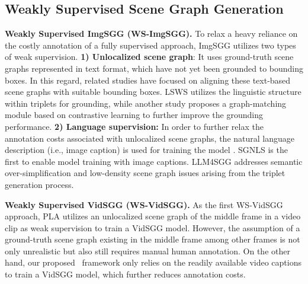 \vspace{-1.5ex}
\subsection{Weakly Supervised Scene Graph Generation}
\vspace{-0.5ex}
\noindent\textbf{Weakly Supervised ImgSGG (WS-ImgSGG). }
To relax a heavy reliance on the costly annotation of a fully supervised approach, ImgSGG utilizes two types of weak supervision. \textbf{1) Unlocalized scene graph}: It uses ground-truth scene graphs represented in text format, which have not yet been grounded to bounding boxes. In this regard, related studies \citep{ye2021linguistic,shi2021simple,zareian2020weakly,li2022integrating} have focused on aligning these text-based scene graphs with suitable bounding boxes. LSWS \citep{ye2021linguistic} utilizes the linguistic structure within triplets for grounding, while another study \citep{shi2021simple} proposes a graph-matching module based on contrastive learning to further improve the grounding performance. \textbf{2) Language supervision:} In order to further relax the annotation costs associated with unlocalized scene graphs, the natural language description (i.e., image caption) is used for training the model \citep{zhong2021learning,kim2024llm4sgg,zhang2023learning}. SGNLS \citep{zhong2021learning} is the first to enable model training with image captions. LLM4SGG \citep{kim2024llm4sgg} addresses semantic over-simplification and low-density scene graph issues arising from the triplet generation process. 

\smallskip
\noindent\textbf{Weakly Supervised VidSGG (WS-VidSGG). }
As the first WS-VidSGG approach, PLA \citep{chen2023video} utilizes an unlocalized scene graph of the middle frame in a video clip as weak supervision to train a VidSGG model. 
However, the assumption of a ground-truth scene graph existing in the middle frame among other frames is not only unrealistic but also still requires manual human annotation. On the other hand, our proposed~\proposed{} framework only relies on the readily available video captions to train a VidSGG model, which further reduces annotation costs.



